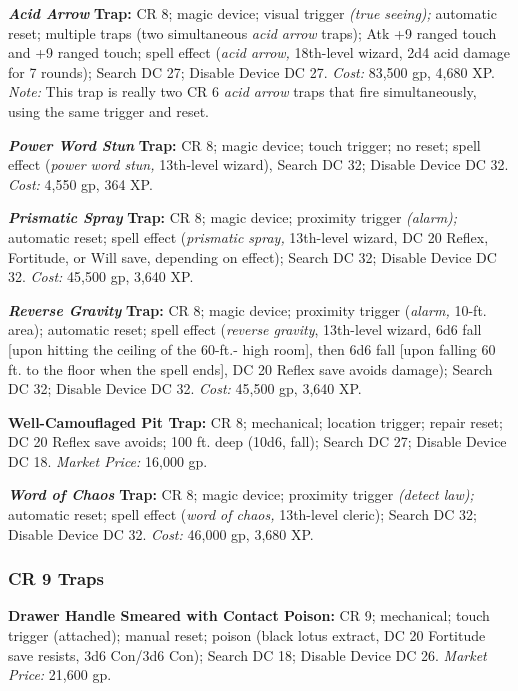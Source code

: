 \documentclass{article}
\begin{document}
\textit{\textbf{Acid Arrow }}\textbf{Trap: }CR 8; magic device; visual trigger 
\textit{(true seeing); }automatic reset; multiple traps (two simultaneous \textit{acid 
arrow }traps); Atk +9 ranged touch and +9 ranged touch; spell effect (\textit{acid 
arrow, }18th-level wizard, 2d4 acid damage for 7 rounds); Search DC 27; Disable 
Device DC 27. \textit{Cost: }83,500 gp, 4,680 XP. \textit{Note: }This trap is really 
two CR 6 \textit{acid arrow }traps that fire simultaneously, using the same trigger 
and reset.

\textit{\textbf{Power Word Stun }}\textbf{Trap:} CR 8; magic device; touch trigger; 
no reset; spell effect (\textit{power word stun, }13th-level wizard), Search DC 
32; Disable Device DC 32. \textit{Cost: }4,550 gp, 364 XP.

\textit{\textbf{Prismatic Spray }}\textbf{Trap: }CR 8; magic device; proximity 
trigger \textit{(alarm); }automatic reset; spell effect (\textit{prismatic spray, 
}13th-level wizard, DC 20 Reflex, Fortitude, or Will save, depending on effect); 
Search DC 32; Disable Device DC 32. \textit{Cost: }45,500 gp, 3,640 XP.

\textit{\textbf{Reverse Gravity }}\textbf{Trap:} CR 8; magic device; proximity 
trigger (\textit{alarm, }10-ft. area); automatic reset; spell effect (\textit{reverse 
gravity}, 13th-level wizard, 6d6 fall [upon hitting the ceiling of the 60-ft.- 
high room], then 6d6 fall [upon falling 60 ft. to the floor when the spell ends], 
DC 20 Reflex save avoids damage); Search DC 32; Disable Device DC 32. \textit{Cost: 
}45,500 gp, 3,640 XP.

\textbf{Well-Camouflaged Pit Trap:} CR 8; mechanical; location trigger; repair 
reset; DC 20 Reflex save avoids; 100 ft. deep (10d6, fall); Search DC 27; Disable 
Device DC 18. \textit{Market Price: }16,000 gp.

\textit{\textbf{Word of Chaos }}\textbf{Trap:} CR 8; magic device; proximity trigger 
\textit{(detect law); }automatic reset; spell effect (\textit{word of chaos, }13th-level 
cleric); Search DC 32; Disable Device DC 32. \textit{Cost: }46,000 gp, 3,680 XP.

\vspace{12pt}
\subsubsection*{\textbf{CR 9 Traps}}

\textbf{Drawer Handle Smeared with Contact Poison: }CR 9; mechanical; touch trigger 
(attached); manual reset; poison (black lotus extract, DC 20 Fortitude save resists, 
3d6 Con/3d6 Con); Search DC 18; Disable Device DC 26. \textit{Market Price: }21,600 
gp. 
\end{document}

